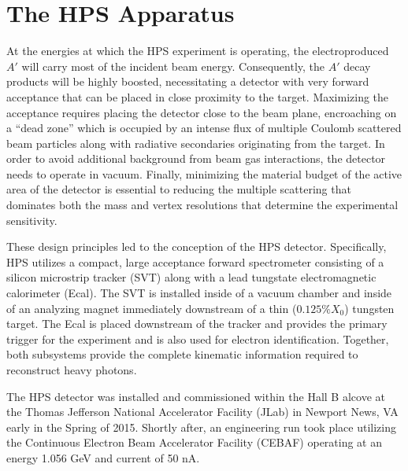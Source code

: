 
\chapter{The HPS Apparatus}


At the energies at which the HPS experiment is operating, the 
electroproduced $A'$ will carry most of the incident beam energy. Consequently,
the $A'$ decay products will be highly boosted, necessitating a detector with very
forward acceptance that can be placed in close proximity to the target.
Maximizing the acceptance requires placing the detector close to the beam plane,
encroaching on a ``dead zone'' which is occupied by an intense flux of multiple
Coulomb scattered beam particles along with radiative secondaries originating
from the target.  In order to avoid additional background from beam gas
interactions, the detector needs to operate in vacuum. Finally, minimizing the
material budget of the active area of the detector is essential to reducing the
multiple scattering that dominates both the mass and vertex resolutions that
determine the experimental sensitivity.

These design principles led to the conception of the HPS detector.  
Specifically, HPS utilizes a compact, large acceptance forward spectrometer 
consisting of a silicon microstrip tracker (SVT) along with a lead tungstate
electromagnetic calorimeter (Ecal).  The SVT is installed inside of a vacuum
chamber and inside of an analyzing magnet immediately downstream of a thin
($0.125\%X_{0}$) tungsten target.
The Ecal is placed downstream of the tracker and provides the primary 
trigger for the experiment and is also used for electron identification. Together, 
both subsystems provide the complete kinematic information required to 
reconstruct heavy photons.

The HPS detector was installed and commissioned within the Hall B alcove at the
Thomas Jefferson National Accelerator Facility (JLab) in Newport News, VA early
in the Spring of 2015. Shortly after, an engineering run took place utilizing
the Continuous Electron Beam Accelerator Facility (CEBAF) operating at an 
energy 1.056 GeV and current of 50 nA.

